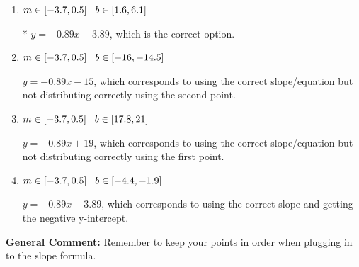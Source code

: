 \documentclass{extbook}[14pt]
\begin{document}
\begin{enumerate}
{\begin{enumerate}[label=\Alph*.]
 $y = 0.89x -13.89$, which corresponds to using the negative slope and the correct equation.
\item \( m \in [-3.7, 0.5] \hspace*{3mm} b \in [1.6, 6.1] \)

* $y = -0.89x + 3.89$, which is the correct option.
\item \( m \in [-3.7, 0.5] \hspace*{3mm} b \in [-16, -14.5] \)

 $y = -0.89x -15$, which corresponds to using the correct slope/equation but not distributing correctly using the second point.
\item \( m \in [-3.7, 0.5] \hspace*{3mm} b \in [17.8, 21] \)

 $y = -0.89x + 19$, which corresponds to using the correct slope/equation but not distributing correctly using the first point.
\item \( m \in [-3.7, 0.5] \hspace*{3mm} b \in [-4.4, -1.9] \)

 $y = -0.89x -3.89$, which corresponds to using the correct slope and getting the negative y-intercept.
\end{enumerate}

\textbf{General Comment:} Remember to keep your points in order when plugging in to the slope formula.
}
\end{enumerate}
\end{document}
